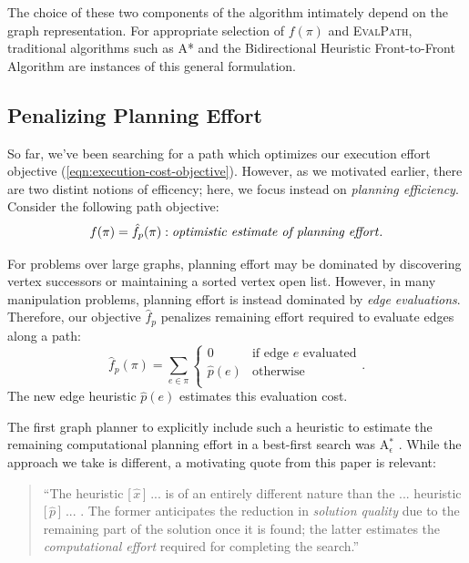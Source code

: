 \vspace{0.1in}
The choice of these two components of the algorithm
intimately depend on the graph representation.
For appropriate selection
of $f(\pi)$ and \textsc{EvalPath},
traditional algorithms such as A* \citep{hart1968astar}
and the Bidirectional Heuristic Front-to-Front Algorithm
\citep{champeauxsint1977bhffa}
are instances of this general formulation.

\subsection{Penalizing Planning Effort}

So far, we've been searching for a path which optimizes our execution
effort objective (\ref{eqn:execution-cost-objective}).
However, as we motivated earlier,
there are two distint notions of efficency;
here, we focus instead on \emph{planning efficiency}.
Consider the following path objective:
\begin{equation}
   f(\pi) = \hat{f}_p(\pi) : \mbox{\emph{optimistic estimate of planning effort}}.
\end{equation}

For problems over large graphs,
planning effort may be dominated by discovering vertex successors
or maintaining a sorted vertex open list.
However, in many manipulation problems,
planning effort is instead dominated by \emph{edge evaluations}.
Therefore, our objective $\hat{f}_p$
penalizes remaining effort required to evaluate edges
along a path:
\begin{equation}
   \hat{f}_p(\pi) = \sum_{e \in \pi} \left\{
   \begin{array}{cl}
      0 & \mbox{if edge } e \mbox{ evaluated}  \\
      \hat{p}(e) & \mbox{otherwise} \\
   \end{array}
   \right.
   .
\end{equation}
The new edge heuristic $\hat{p}(e)$ estimates this evaluation cost.

The first graph planner to explicitly include such a heuristic
to estimate the remaining
computational planning effort in a best-first search
was A$_\epsilon^*$ \citep{pearl1982semiadmissible}.
While the approach we take is different,
a motivating quote from this paper is relevant:
\begin{quote}
``The heuristic [\,$\hat{x}$\,] ... is of an entirely
different nature than the ... heuristic [\,$\hat{p}$\,] ... .
The former anticipates the reduction in \emph{solution quality} due to the
remaining part of the solution once it is found;
the latter estimates the \emph{computational effort}
required for completing the search.''
\end{quote}

